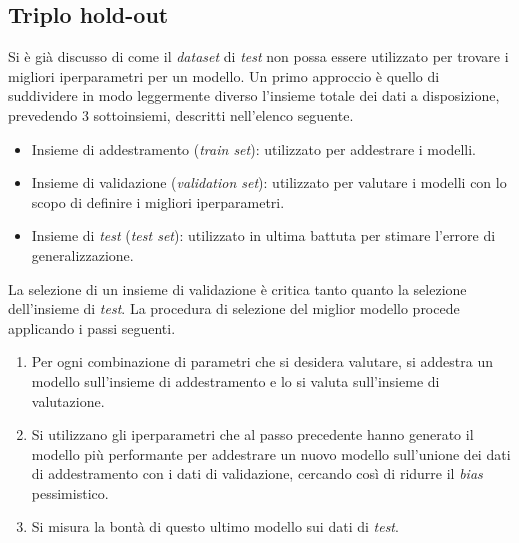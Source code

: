 \subsection{Triplo hold-out}
Si è già discusso di come il \emph{dataset} di \emph{test} non possa essere utilizzato per trovare i migliori iperparametri per un modello.
Un primo approccio è quello di suddividere in modo leggermente diverso l'insieme totale dei dati a disposizione, prevedendo 3 sottoinsiemi, descritti nell'elenco seguente.
\begin{itemize}
    \item Insieme di addestramento (\emph{train set}): utilizzato per addestrare i modelli.
    \item Insieme di validazione (\emph{validation set}): utilizzato per valutare i modelli con lo scopo di definire i migliori iperparametri.
    \item Insieme di \emph{test} (\emph{test set}): utilizzato in ultima battuta per stimare l'errore di generalizzazione.
\end{itemize}
La selezione di un insieme di validazione è critica tanto quanto la selezione dell'insieme di \emph{test}.
La procedura di selezione del miglior modello procede applicando i passi seguenti.
\begin{enumerate}
    \item Per ogni combinazione di parametri che si desidera valutare, si addestra un modello sull'insieme di addestramento e lo si valuta sull'insieme di valutazione.
    \item Si utilizzano gli iperparametri che al passo precedente hanno generato il modello più performante per addestrare un nuovo modello sull'unione dei dati di addestramento con i dati di validazione, cercando così di ridurre il \emph{bias} pessimistico.
    \item Si misura la bontà di questo ultimo modello sui dati di \emph{test}.
\end{enumerate}

